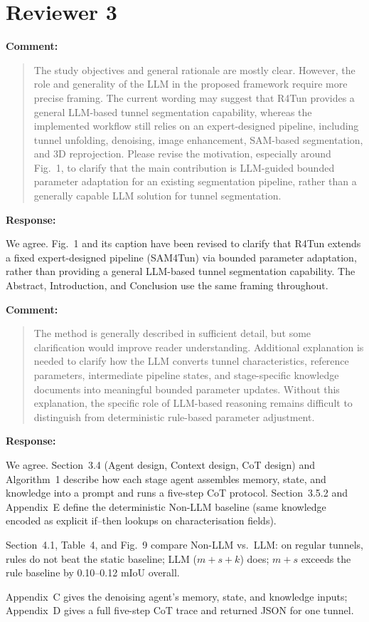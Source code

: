 \documentclass[11pt,a4paper]{article}
\newenvironment{commentblock}{%
  \par\smallskip\noindent\textbf{Comment:}\par
  \begin{quote}\itshape\color{black}
}{%
  \end{quote}\smallskip
}
\newenvironment{responseblock}{%
  \par\smallskip\noindent\textbf{Response:}\par
  \begingroup\color{responsegreen}
}{%
  \endgroup\smallskip
}
\begin{document}
\section*{Reviewer 3}

\begin{commentblock}
The study objectives and general rationale are mostly clear. However, the role and generality of the LLM in the proposed framework require more precise framing. The current wording may suggest that R4Tun provides a general LLM-based tunnel segmentation capability, whereas the implemented workflow still relies on an expert-designed pipeline, including tunnel unfolding, denoising, image enhancement, SAM-based segmentation, and 3D reprojection. Please revise the motivation, especially around Fig.~1, to clarify that the main contribution is LLM-guided bounded parameter adaptation for an existing segmentation pipeline, rather than a generally capable LLM solution for tunnel segmentation.
\end{commentblock}
\begin{responseblock}
We agree. Fig.~1 and its caption have been revised to clarify that R4Tun extends a fixed expert-designed pipeline (SAM4Tun) via bounded parameter adaptation, rather than providing a general LLM-based tunnel segmentation capability. The Abstract, Introduction, and Conclusion use the same framing throughout.
\end{responseblock}

\begin{commentblock}
The method is generally described in sufficient detail, but some clarification would improve reader understanding. Additional explanation is needed to clarify how the LLM converts tunnel characteristics, reference parameters, intermediate pipeline states, and stage-specific knowledge documents into meaningful bounded parameter updates. Without this explanation, the specific role of LLM-based reasoning remains difficult to distinguish from deterministic rule-based parameter adjustment.
\end{commentblock}
\begin{responseblock}
We agree. Section~3.4 (Agent design, Context design, CoT design) and Algorithm~1 describe how each stage agent assembles memory, state, and knowledge into a prompt and runs a five-step CoT protocol. Section~3.5.2 and Appendix~E define the deterministic Non-LLM baseline (same knowledge encoded as explicit if--then lookups on characterisation fields).

Section~4.1, Table~4, and Fig.~9 compare Non-LLM vs.\ LLM: on regular tunnels, rules do not beat the static baseline; LLM ($m+s+k$) does; $m+s$ exceeds the rule baseline by 0.10--0.12 mIoU overall.

Appendix~C gives the denoising agent's memory, state, and knowledge inputs; Appendix~D gives a full five-step CoT trace and returned JSON for one tunnel.
\end{responseblock}
\end{document}
